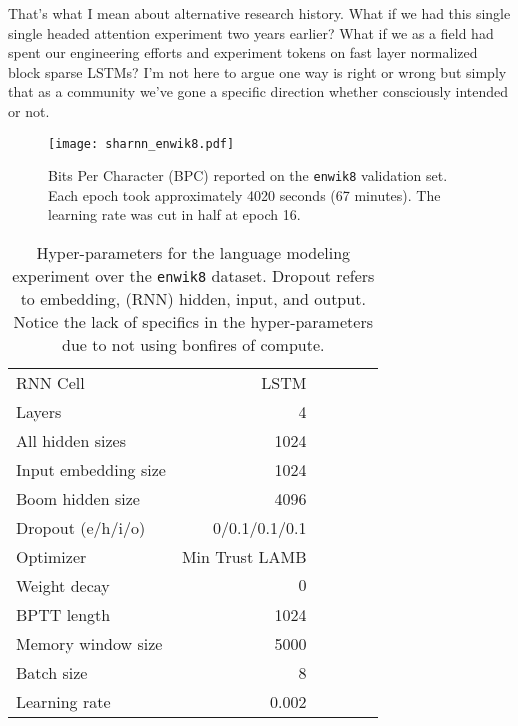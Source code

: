 \documentclass{article}
\newcommand{\enwik}{\texttt{enwik8}\xspace}
\begin{document}
That's what I mean about alternative research history.
What if we had this single single headed attention experiment two years earlier?
What if we as a field had spent our engineering efforts and experiment tokens on fast layer normalized block sparse LSTMs?
I'm not here to argue one way is right or wrong but simply that as a community we've gone a specific direction whether consciously intended or not.











\begin{figure}[t]
 \centering 
 \texttt{[image: sharnn\_enwik8.pdf]}
\caption{Bits Per Character (BPC) reported on the \enwik validation set. Each epoch took approximately 4020 seconds (67 minutes). The learning rate was cut in half at epoch 16.}
\label{fig:bpcsharnn}
\end{figure}

\begin{table}
\renewcommand{\arraystretch}{1.1}
\begin{center}
 \begin{tabular}{@{} lrrrrr @{}} 
 \toprule[1.5pt]
\midrule
 RNN Cell & \small{LSTM} \\ Layers & 4 \\
 All hidden sizes & 1024 \\
 Input embedding size & 1024 \\
 Boom hidden size & 4096 \\
 Dropout (e/h/i/o) & 0/0.1/0.1/0.1 \\
\midrule
 Optimizer & Min Trust LAMB \\
 Weight decay & $0$ \\
 BPTT length & 1024 \\
 Memory window size & 5000 \\
 Batch size & 8 \\
 Learning rate & 0.002 \\
 \midrule
\bottomrule[1.5pt]
\end{tabular}
\caption{
Hyper-parameters for the language modeling experiment over the \enwik dataset.
Dropout refers to embedding, (RNN) hidden, input, and output.
Notice the lack of specifics in the hyper-parameters due to not using bonfires of compute.
\label{table:fullhypers}}
\end{center}
\end{table}
\end{document}
